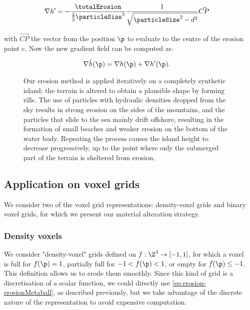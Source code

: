 \begin{align}
    \label{eq:erosion-erosion-gradients}
    \nabla h' = - \frac{\totalErosion}{\frac{2}{3}\particleSize^3} \frac{1}{\sqrt{\particleSize^2 - d^2} } \vec{CP}
\end{align}

with $\vec{CP}$ the vector from the position $\p$ to evaluate to the centre of the erosion point $c$.
Now the new gradient field can be computed as: 

\begin{align*}
    \nabla \Tilde{h}(\p) = \nabla h(\p) + \nabla h'(\p).
\end{align*}

\begin{figure*}
    \centering
    \caption{Our erosion method is applied iteratively on a completely synthetic island; the terrain is altered to obtain a plausible shape by forming rills. The use of particles with hydraulic densities dropped from the sky results in strong erosion on the sides of the mountains, and the particles that slide to the sea mainly drift offshore, resulting in the formation of small beaches and weaker erosion on the bottom of the water body. Repeating the process causes the island height to decrease progressively, up to the point where only the submerged part of the terrain is sheltered from erosion.}
    \label{fig:erosion-continuous-erosion}
\end{figure*}

\subsection{Application on voxel grids}
\label{sec:erosion-application_on_voxels}

We consider two of the voxel grid representations: density-voxel grids and binary voxel grids, for which we present our material alteration strategy.

\subsubsection{Density voxels}
\label{sec:erosion-application_on_density_voxels}

We consider "density-voxel" grids defined on $f: \Z^3 \to [-1, 1]$, for which a voxel is full for $f(\p) = 1$, partially full for $-1 < f(\p) < 1$, or empty for $f(\p) \leq -1$.  
This definition allows us to erode them smoothly.  
Since this kind of grid is a discretisation of a scalar function, we could directly use \eqref{eq:erosion-erosionMetaball}, as described previously, but we take advantage of the discrete nature of the representation to avoid expensive computation. 

